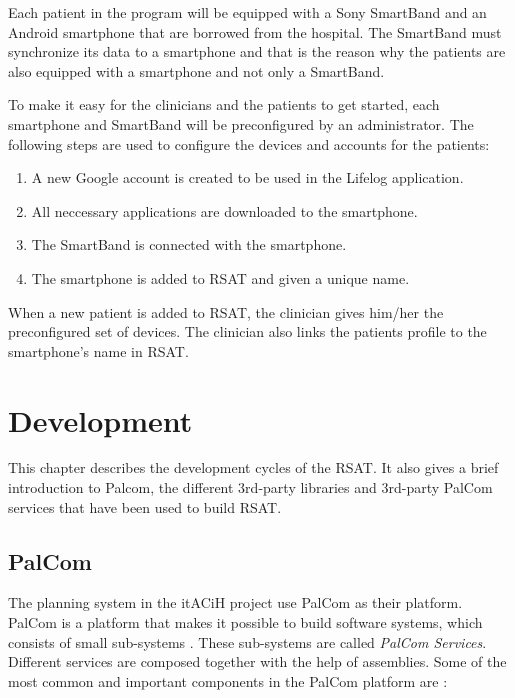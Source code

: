 \documentclass{cslthse-msc}
\begin{document}
Each patient in the program will be equipped with a Sony SmartBand and an Android smartphone that are borrowed from the hospital. The SmartBand must synchronize its data to a smartphone and that is the reason why the patients are also equipped with a smartphone and not only a SmartBand.   

To make it easy for the clinicians and the patients to get started, each smartphone and SmartBand will be  preconfigured by an administrator. The following steps are used to configure the devices and accounts for the patients:

\begin{enumerate}
    \item{A new Google account is created to be used in the Lifelog application.}
    \item{All neccessary applications are downloaded to the smartphone.}
    \item{The SmartBand is connected with the smartphone.}
    \item{The smartphone is added to RSAT and given a unique name.}
\end{enumerate}

When a new patient is added to RSAT, the clinician gives him/her the preconfigured set of devices. The clinician also links the patients profile to the smartphone's name in RSAT. 


\chapter{Development}
This chapter describes the development cycles of the RSAT. It also gives a brief introduction to Palcom, the different 3rd-party libraries and 3rd-party PalCom services that have been used to build RSAT.

\section{PalCom}
The planning system in the itACiH project use PalCom as their platform. PalCom is a platform that makes it possible to build software systems, which consists of small sub-systems \cite{svenssonfors2009}. These sub-systems are called \emph{PalCom Services}. Different services are composed together with the help of assemblies. Some of the most common and important components in the PalCom platform are \cite{svenssonfors2009}: 
\end{document}
